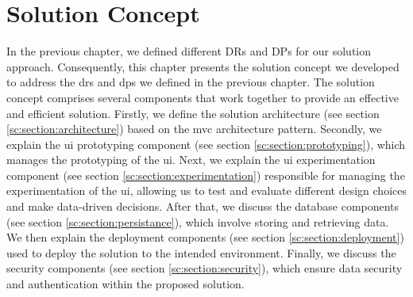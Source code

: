 
\chapter{Solution Concept}
\label{chap:concept}
\ifpdf
    \graphicspath{{Chapters/Solution-Concept/Figs/}{Chapters/Solution-Concept/Figs/}{Chapters/Solution-Concept/Figs/}}
\else
    \graphicspath{{Chapters/Solution-Concept/Figs/}{Chapters/Solution-Concept/Figs/}}
\fi
In the previous chapter, we defined different DRs and DPs for our solution approach. 
Consequently, this chapter presents the solution concept we developed to address the \ac{dr}s and \ac{dp}s we defined in the previous chapter.
The solution concept comprises several components that work together to provide an effective and efficient solution. 
Firstly, we define the solution architecture (see section \ref{sc:section:architecture}) based on the \ac{mvc} architecture pattern. 
Secondly, we explain the \ac{ui} prototyping component (see section \ref{sc:section:prototyping}), which manages the prototyping of the \ac{ui}. 
Next, we explain the \ac{ui} experimentation component (see section \ref{sc:section:experimentation}) responsible for managing the experimentation of the \ac{ui}, allowing us to test and evaluate different design choices and make data-driven decisions.
After that, we discuss the database components (see section \ref{sc:section:persistance}), which involve storing and retrieving data.
We then explain the deployment components (see section \ref{sc:section:deployment}) used to deploy the solution to the intended environment.
Finally, we discuss the security components (see section \ref{sc:section:security}), which ensure data security and authentication within the proposed solution.



